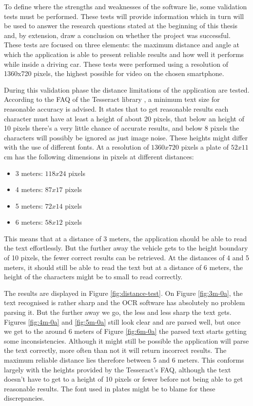 To define where the strengths and weaknesses of the software lie, some validation tests must be performed. These tests will provide information which in turn will be used to answer the research questions stated at the beginning of this thesis and, by extension, draw a conclusion on whether the project was successful. These tests are focused on three elements: the maximum distance and angle at which the application is able to present reliable results and how well it performs while inside a driving car. These tests were performed using a resolution of 1360x720 pixels, the highest possible for video on the chosen smartphone.


During this validation phase the distance limitations of the application are tested. According to the FAQ of the Tesseract library \cite{tesseract-faq}, a minimum text size for reasonable accuracy is advised. It states that to get reasonable results each character must have at least a height of about 20 pixels, that below an height of 10 pixels there's a very little chance of accurate results, and below 8 pixels the characters will possibly be ignored as just image noise. These heights might differ with the use of different fonts. At a resolution of $1360x720$ pixels a plate of $52x11$ cm has the following dimensions in pixels at different distances:

\begin{itemize}
	\item 3 meters: $118x24$ pixels
	\item 4 meters: $87x17$ pixels
	\item 5 meters: $72x14$ pixels
	\item 6 meters: $58x12$ pixels
\end{itemize}

This means that at a distance of 3 meters, the application should be able to read the text effortlessly. But the further away the vehicle gets to the height boundary of 10 pixels, the fewer correct results can be retrieved. At the distances of 4 and 5 meters, it should still be able to read the text but at a distance of 6 meters, the height of the characters might be to small to read correctly.

The results are displayed in Figure \ref{fig:distance-test}. On Figure \ref{fig:3m-0a}, the text recognised is rather sharp and the OCR software has absolutely no problem parsing it. But the further away we go, the less and less sharp the text gets. Figures \ref{fig:4m-0a} and \ref{fig:5m-0a} still look clear and are parsed well, but once we get to the around 6 meters of Figure \ref{fig:6m-0a} the parsed text starts getting some inconsistencies. Although it might still be possible the application will parse the text correctly, more often than not it will return incorrect results. The maximum reliable distance lies therefore between 5 and 6 meters. This conforms largely with the heights provided by the Tesseract's FAQ, although the text doesn't have to get to a height of 10 pixels or fewer before not being able to get reasonable results. The font used in plates might be to blame for these discrepancies.

